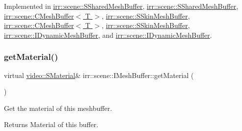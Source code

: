 Implemented in \hyperlink{structirr_1_1scene_1_1SSharedMeshBuffer_ac1dcea2247c8f63adc4a5935ce39bcbc}{irr\+::scene\+::\+S\+Shared\+Mesh\+Buffer}, \hyperlink{structirr_1_1scene_1_1SSharedMeshBuffer_ac1dcea2247c8f63adc4a5935ce39bcbc}{irr\+::scene\+::\+S\+Shared\+Mesh\+Buffer}, \hyperlink{classirr_1_1scene_1_1CMeshBuffer_af69e8356b4525a3fee1ddbf188d81e8a}{irr\+::scene\+::\+C\+Mesh\+Buffer$<$ T $>$}, \hyperlink{structirr_1_1scene_1_1SSkinMeshBuffer_a5e4a6cc69dac5ac75d43d8e89a23da2b}{irr\+::scene\+::\+S\+Skin\+Mesh\+Buffer}, \hyperlink{classirr_1_1scene_1_1CMeshBuffer_af69e8356b4525a3fee1ddbf188d81e8a}{irr\+::scene\+::\+C\+Mesh\+Buffer$<$ T $>$}, \hyperlink{structirr_1_1scene_1_1SSkinMeshBuffer_a5e4a6cc69dac5ac75d43d8e89a23da2b}{irr\+::scene\+::\+S\+Skin\+Mesh\+Buffer}, \hyperlink{classirr_1_1scene_1_1IDynamicMeshBuffer_a6ed3a5ce948ebef063b7ea9e07974eb7}{irr\+::scene\+::\+I\+Dynamic\+Mesh\+Buffer}, and \hyperlink{classirr_1_1scene_1_1IDynamicMeshBuffer_a6ed3a5ce948ebef063b7ea9e07974eb7}{irr\+::scene\+::\+I\+Dynamic\+Mesh\+Buffer}.

\mbox{\label{classirr_1_1scene_1_1IMeshBuffer_a26fd922f00fde56abbbbbe40b485238b}} 
\subsubsection{\texorpdfstring{get\+Material()}{getMaterial()}\hspace{0.1cm}{\footnotesize\ttfamily [2/4]}}
{\footnotesize\ttfamily virtual \hyperlink{classirr_1_1video_1_1SMaterial}{video\+::\+S\+Material}\& irr\+::scene\+::\+I\+Mesh\+Buffer\+::get\+Material (\begin{DoxyParamCaption}{ }\end{DoxyParamCaption})\hspace{0.3cm}{\ttfamily [pure virtual]}}



Get the material of this meshbuffer. 

\begin{DoxyReturn}{Returns}
Material of this buffer. 
\end{DoxyReturn}


